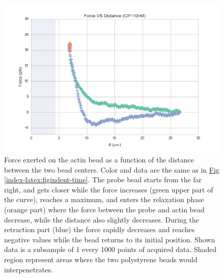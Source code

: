 \documentclass[A4paperpaper,11pt,english]{sphinxmanual}
\begin{document}
\begin{figure}[htbp]
\centering
\capstart

\includegraphics[width=0.800\linewidth]{force-distance.png}
\caption{Force exerted on the actin bead as a function of the distance between the
two bead centers. Color and data are the same as in \hyperref[index-latex:figindent-time]{Fig  \ref*{index-latex:figindent-time}}.
The probe bead starts from the far right, and gets closer
while the force increases (green upper part of the curve), reaches a
maximum, and enters the relaxation phase (orange part) where the force
between the probe and actin bead decrease, while the distance  also
slightly decreases. During the retraction part (blue) the force rapidly
decreases and  reaches negative values while the bead returns to its initial
position. Shown data is a subsample of 1 every 1000 points of acquired
data. Shaded region represent areas where the two polystyrene beads would
interpenetrates.}\label{index-latex:force-distance}\end{figure}
\end{document}
